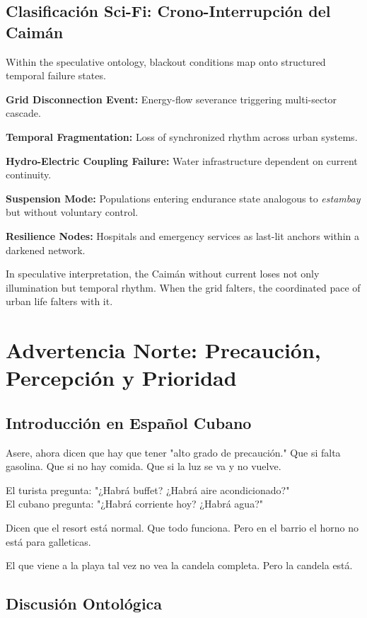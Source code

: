 \documentclass[12pt]{article}
\begin{document}
\subsection*{Clasificación Sci-Fi: Crono-Interrupción del Caimán}

Within the speculative ontology, blackout conditions map onto structured temporal failure states.

\textbf{Grid Disconnection Event:} Energy-flow severance triggering multi-sector cascade.

\textbf{Temporal Fragmentation:} Loss of synchronized rhythm across urban systems.

\textbf{Hydro-Electric Coupling Failure:} Water infrastructure dependent on current continuity.

\textbf{Suspension Mode:} Populations entering endurance state analogous to \textit{estambay} but without voluntary control.

\textbf{Resilience Nodes:} Hospitals and emergency services as last-lit anchors within a darkened network.

In speculative interpretation, the Caimán without current loses not only illumination but temporal rhythm. When the grid falters, the coordinated pace of urban life falters with it.

\section{Advertencia Norte: Precaución, Percepción y Prioridad}

\subsection*{Introducción en Español Cubano}

Asere, ahora dicen que hay que tener "alto grado de precaución." Que si falta gasolina. Que si no hay comida. Que si la luz se va y no vuelve.

El turista pregunta: "¿Habrá buffet? ¿Habrá aire acondicionado?"\\
El cubano pregunta: "¿Habrá corriente hoy? ¿Habrá agua?"

Dicen que el resort está normal. Que todo funciona. Pero en el barrio el horno no está para galleticas.

El que viene a la playa tal vez no vea la candela completa. Pero la candela está.

\subsection*{Discusión Ontológica}
\end{document}
